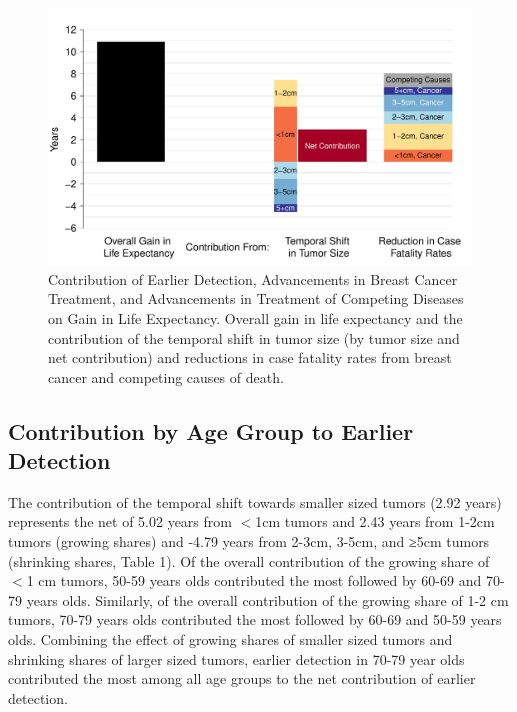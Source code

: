 \documentclass[11pt,letterpaper]{article}
\theoremstyle{plain}
\theoremstyle{remark}
\numberwithin{equation}{section}
\begin{document}
\begin{figure}[h]
\begin{center}
\includegraphics[width=\linewidth]{figure2}
\caption{Contribution of Earlier Detection, Advancements
  in Breast Cancer Treatment, and Advancements in Treatment of
  Competing Diseases on Gain in Life Expectancy.  Overall gain in life
  expectancy and the contribution of the temporal shift in tumor size
  (by tumor size and net contribution) and reductions in case fatality
  rates from breast cancer and competing causes of death.}
\label{fig:simple_case}
\end{center}
\end{figure}

\subsection{Contribution by Age Group to Earlier Detection}
The contribution of the temporal shift towards smaller sized tumors
(2.92 years) represents the net of 5.02 years from $<$1cm tumors and
2.43 years from 1-2cm tumors (growing shares) and -4.79 years from
2-3cm, 3-5cm, and ≥5cm tumors (shrinking shares, Table 1).  Of the
overall contribution of the growing share of $<$1 cm tumors, 50-59 years
olds contributed the most followed by 60-69 and 70-79 years
olds. Similarly, of the overall contribution of the growing share of
1-2 cm tumors, 70-79 years olds contributed the most followed by 60-69
and 50-59 years olds. Combining the effect of growing shares of
smaller sized tumors and shrinking shares of larger sized tumors,
earlier detection in 70-79 year olds contributed the most among all
age groups to the net contribution of earlier detection.
\end{document}
